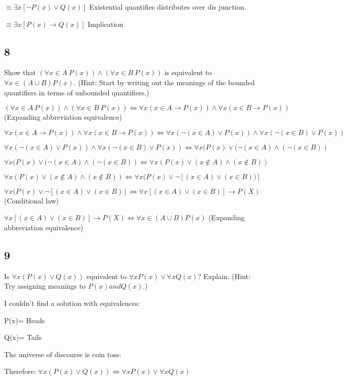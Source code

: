 \documentclass{article}
\begin{document}
$\equiv \exists x[\neg P(x) \lor Q(x)]$ Existential quantifies distributes over dis junction.

$\equiv \exists x [P(x) \rightarrow Q(x)]$ Implication
\subsection{8}
Show that $(\forall x \in A \ P(x)) \land (\forall x \in B  \ P(x))$ is equivalent to $\forall x \in (A \cup B) P(x)$. (Hint: Start by writing out the meanings of the bounded
quantifiers in terms of unbounded quantifiers.)

$(\forall x \in A \ P(x)) \land (\forall x \in B  \ P(x))\Leftrightarrow \forall x (x\in A \rightarrow P(x)) \land \forall x (x\in B  \rightarrow P(x)) $ (Expanding abbreviation equivalence)

$\forall x (x\in A \rightarrow P(x)) \land \forall x (x\in B  \rightarrow P(x)) \Leftrightarrow \forall x (\neg (x\in A) \lor P(x)) \land \forall x (\neg (x\in B)  \lor P(x))$

$\forall x (\neg (x\in A) \lor P(x)) \land \forall x (\neg (x\in B)  \lor P(x)) \Leftrightarrow \forall x(P(x)\lor(\neg(x \in A)\land (\neg (x \in B))$

$\forall x(P(x)\lor(\neg(x \in A)\land (\neg (x \in B)) \Leftrightarrow \forall x(P(x)\lor(x \notin A)\land (x \notin B))$ 

$\forall x(P(x)\lor(x \notin A)\land (x \notin B)) \Leftrightarrow \forall x(P(x)\lor \neg[(x \in A)\lor (x \in B))]$

$\forall x(P(x)\lor \neg[(x \in A)\lor (x \in B)] \Leftrightarrow  \forall x[(x \in A)\lor (x \in B)]\rightarrow P(X)$ (Conditional law)

$\forall x[(x \in A)\lor (x \in B)]\rightarrow P(X) \Leftrightarrow \forall x \in (A \cup B) P(x)$ (Expanding abbreviation equivalence)
\subsection{9}
Is $\forall x(P(x) \lor Q(x))$ equivalent to $\forall xP(x) \lor \forall xQ(x)$? Explain. (Hint:
Try assigning meanings to $P(x) and Q(x).$)

I couldn't find a solution with equivalences:

P(x)= Heads

Q(x)= Tails

The universe of discourse is coin toss:

Therefore:
$\forall x(P(x) \lor Q(x))\Leftrightarrow \forall xP(x) \lor \forall xQ(x)$
\end{document}
